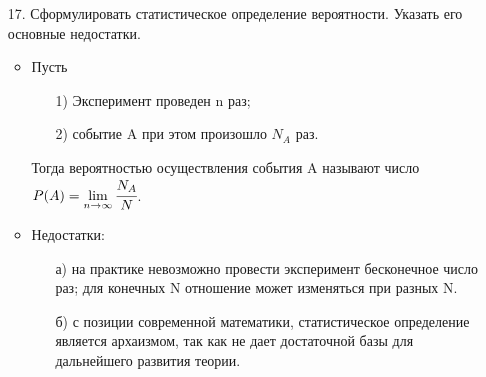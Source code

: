 \documentclass[a4paper]{article}
\begin{document}
\begin{enumerate}
\item[17.] Сформулировать статистическое определение вероятности. Указать его основные недостатки. \\
\begin{itemize}
\item Пусть \\
	\begin{enumerate}
	\item[1)] Эксперимент проведен n раз;
	\item[2)] событие A при этом произошло $N_A$ раз.
	\end{enumerate}
Тогда вероятностью осуществления события A называют число $P(A) = \lim\limits_{n \to \infty} \cfrac{N_A}{N}$.
\item Недостатки: \\
	\begin{enumerate}
	\item[а)] на практике невозможно провести эксперимент бесконечное число раз; для конечных N отношение может изменяться при разных N.
	\item[б)] с позиции современной математики, статистическое определение является архаизмом, так как не дает достаточной базы для дальнейшего развития теории.
	\end{enumerate}
\end{itemize}




\end{enumerate}
\end{document}
